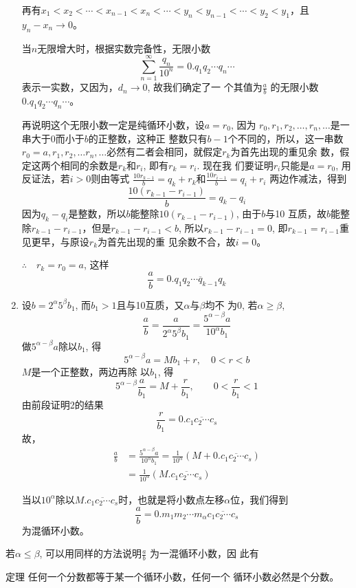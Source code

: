 \begin{enumerate}
再有$x_1<x_2<\cdots<x_{n-1}<x_n<\cdots<y_n<y_{n-1}<\cdots<y_2<y_1$，且$y_n-x_n\to 0$。

当$n$无限增大时，根据实数完备性，无限小数
\[\sum_{n=1}^{\infty}\frac{q_n}{10^n}=0.q_1q_2\cdots q_n\cdots\]
表示一实数，又因为，$d_n\to 0$, 故我们确定了一
个其值为$\frac{a}{b}$
的无限小数$0.q_1q_2\cdots q_n\cdots$。

再说明这个无限小数一定是纯循环小数，设$a=r_0$, 因为
$r_0,r_1,r_2,\ldots,r_n,\ldots$是一串大于0而小于$b$的正整数，这种正
整数只有$b-1$个不同的，所以，这一串数$r_0=a,r_1,r_2,\ldots r_n,\ldots$必然有二者会相同，就假定$r_k$为首先出现的重见余
数，假定这两个相同的余数是$r_k$和$r_i$, 即有$r_k=r_i$. 现在我
们要证明$r_i$只能是$a=r_0$, 用反证法，若$i>0$则由等式
$\frac{10r_{k-1}}{b}=q_k+r_k$和$\frac{10r_{i-1}}{b}=q_i+r_i$ 两边作减法，得到
\[\frac{10(r_{k-1}-r_{i-1})}{b}=q_k-q_i\]
因为$q_k-q_i$是整数，所以$b$能整除$10(r_{k-1}-r_{i-1})$, 由于$b$与10
互质，故$b$能整除$r_{k-1}-r_{i-1}$，但是$r_{k-1}-r_{i-1}<b$, 所以$r_{k-1}-r_{i-1}=0$, 即$r_{k-1}=r_{i-1}$重见更早，与原设$r_k$为首先出现的重
见余数不合，故$i=0$。

$\therefore\quad r_k=r_0=a$, 这样
\[\frac{a}{b}=0.\overline{q_1q_2\cdots q_{k-1}q_k}\]

\item 设$b=2^{\alpha}5^{\beta}b_1$, 而$b_1>1$且与10互质，又$\alpha$与$\beta$均不
为0, 若$\alpha\ge \beta$,
\[\frac{a}{b}=\frac{a}{2^{\alpha}5^{\beta}b_1}=\frac{5^{\alpha-\beta}a}{10^{\alpha}b_1}\]
做$5^{\alpha-\beta}a$除以$b_1$, 得
\[5^{\alpha-\beta}a=M{b_1}+{r},\quad 0<r<b\]
$M$是一个正整数，两边再除
以$b_1$, 得
\[5^{\alpha-\beta}\frac{a}{b_1}=M+\frac{r}{b_1},\qquad 0<\frac{r}{b_1}<1\]
由前段证明2的结果
\[\frac{r}{b_1}=0.\overline{c_1c_2\cdots c_{s}}\]
故，
\[\begin{split}
    \frac{a}{b}&=\frac{5^{\alpha-\beta}a}{10^{\alpha}b_1}=\frac{1}{10^{\alpha}}\left(M+0.\overline{c_1c_2\cdots c_{s}}\right)\\
    &=\frac{1}{10^{\alpha}}\left(M.\overline{c_1c_2\cdots c_{s}}\right)
\end{split}\]

当以$10^{\alpha}$除以$M.\overline{c_1c_2\cdots c_{s}}$时，也就是将小数点左移$\alpha$位，我们得到
\[\frac{a}{b}=0.m_1m_2\cdots m_{\alpha}\overline{c_1c_2\cdots c_{s}}\]
为混循环小数。
\end{enumerate}

若$\alpha\le \beta$, 可以用同样的方法说明$\frac{a}{b}$
为一混循环小数，因
此有
\begin{blk}{定理}
    任何一个分数都等于某一个循环小数，任何一个
循环小数必然是个分数。
\end{blk}


